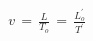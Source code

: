\documentclass[preview]{standalone}
\begin{document}
\begin{align*}
v\,=\,\frac{L}{T_{o}}\,=\,\frac{L^{'}_{o}}{T^{'}}
\end{align*}
\end{document}
